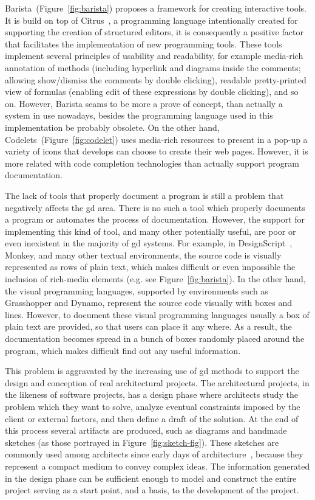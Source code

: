 Barista~(Figure~\ref{fig:barista}) proposes a framework for creating interactive tools. It is build on top of Citrus~\citep{ko2005citrus}, a programming language intentionally created for supporting the creation of structured editors, it is consequently a positive factor that facilitates the implementation of new programming tools. These tools implement several principles of usability and readability, for example media-rich annotation of methods (including hyperlink and diagrams inside the comments; allowing show/dismiss the comments by double clicking), readable pretty-printed view of formulas (enabling edit of these expressions by double clicking), and so on. However, Barista seams to be more a prove of concept, than actually a system in use nowadays, besides the programming language used in this implementation be probably obsolete. On the other hand, Codelets~(Figure~\ref{fig:codelet}) uses media-rich resources to present in a pop-up a variety of icons that develops can choose to create their web pages. However, it is more related with code completion technologies than actually support program documentation.

The lack of tools that properly document a program is still a problem that negatively affects the \gls{gd} area. There is no such a tool which properly documents a program or automates the process of documentation. However, the support for implementing this kind of tool, and many other potentially useful, are poor or even inexistent in the majority of \gls{gd} systems. For example, in DesignScript~\citep{aish2012designscript}, Monkey, and many other textual environments, the source code is visually represented as rows of plain text, which makes difficult or even impossible the inclusion of rich-media elements (e.g. see Figure~\ref{fig:barista}). In the other hand, the visual programming languages, supported by environments such as Grasshopper and Dynamo, represent the source code visually with boxes and lines. However, to document these visual programming languages usually a box of plain text are provided, so that users can place it any where. As a result, the documentation becomes spread in a bunch of boxes randomly placed around the program, which makes difficult find out any useful information.

This problem is aggravated by the increasing use of \gls{gd} methods to support the design and conception of real architectural projects. The architectural projects, in the likeness of software projects, has a design phase where architects study the problem which they want to solve, analyze eventual constraints imposed by the client or external factors, and then define a draft of the solution. At the end of this process several artifacts are produced, such as diagrams and handmade sketches (as those portrayed in Figure~\ref{fig:sketch-fig}). These sketches are commonly used among architects since early days of architecture~\citep{do2001thinking}, because they represent a compact medium to convey complex ideas. The information generated in the design phase can be sufficient enough to model and construct the entire project serving as a start point, and a basis, to the development of the project. 

